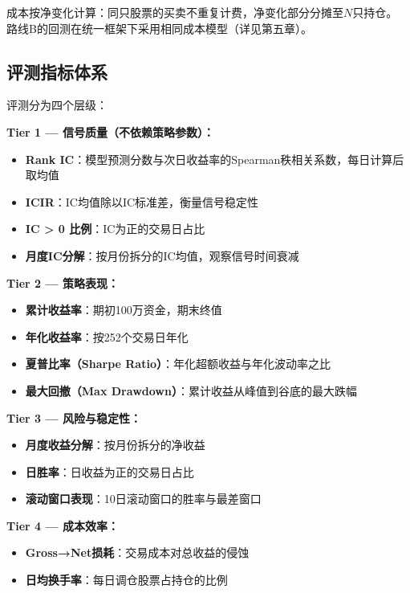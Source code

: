 \documentclass[12pt,a4paper]{ctexart}
\begin{document}
成本按净变化计算：同只股票的买卖不重复计费，净变化部分分摊至$N$只持仓。
路线B的回测在统一框架下采用相同成本模型（详见第五章）。

\subsection{评测指标体系}

评测分为四个层级：

\textbf{Tier 1 — 信号质量（不依赖策略参数）：}
\begin{itemize}[leftmargin=*]
    \item \textbf{Rank IC}：模型预测分数与次日收益率的Spearman秩相关系数，每日计算后取均值
    \item \textbf{ICIR}：IC均值除以IC标准差，衡量信号稳定性
    \item \textbf{IC > 0 比例}：IC为正的交易日占比
    \item \textbf{月度IC分解}：按月份拆分的IC均值，观察信号时间衰减
\end{itemize}

\textbf{Tier 2 — 策略表现：}
\begin{itemize}[leftmargin=*]
    \item \textbf{累计收益率}：期初100万资金，期末终值
    \item \textbf{年化收益率}：按252个交易日年化
    \item \textbf{夏普比率（Sharpe Ratio）}：年化超额收益与年化波动率之比
    \item \textbf{最大回撤（Max Drawdown）}：累计收益从峰值到谷底的最大跌幅
\end{itemize}

\textbf{Tier 3 — 风险与稳定性：}
\begin{itemize}[leftmargin=*]
    \item \textbf{月度收益分解}：按月份拆分的净收益
    \item \textbf{日胜率}：日收益为正的交易日占比
    \item \textbf{滚动窗口表现}：10日滚动窗口的胜率与最差窗口
\end{itemize}

\textbf{Tier 4 — 成本效率：}
\begin{itemize}[leftmargin=*]
    \item \textbf{Gross→Net损耗}：交易成本对总收益的侵蚀
    \item \textbf{日均换手率}：每日调仓股票占持仓的比例
\end{itemize}

\end{document}
